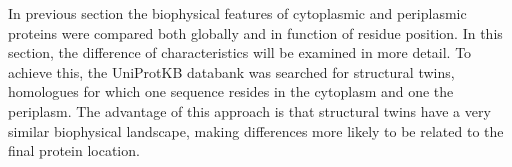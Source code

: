 In previous section the biophysical features of cytoplasmic and periplasmic proteins were compared both globally and in function of residue position.
In this section, the difference of characteristics will be examined in more detail.
To achieve this, the UniProtKB databank was searched for structural twins,
homologues for which one sequence resides in the cytoplasm and one the periplasm.
The advantage of this approach is that structural twins have a very similar biophysical landscape,
making differences more likely to be related to the final protein location.
